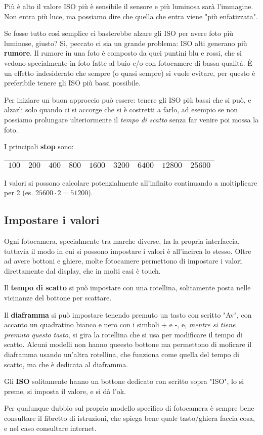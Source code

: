 Più è alto il valore ISO più è sensibile il sensore e più luminosa sarà l'immagine.\\
\nb Non entra più luce, ma possiamo dire che quella che entra viene "più enfatizzata".

Se fosse tutto così semplice ci basterebbe alzare gli ISO per avere foto più luminose, giusto? Sì, peccato ci sia un grande problema: ISO alti generano più \textbf{rumore}.
Il rumore in una foto è composto da quei puntini blu e rossi, che si vedono specialmente in foto fatte al buio e/o con fotocamere di bassa qualità. È un effetto indesiderato che sempre (o quasi sempre) si vuole evitare,
per questo è preferibile tenere gli ISO più bassi possibile.

Per iniziare un buon approccio può essere: tenere gli ISO più bassi che si può, e alzarli solo quando ci si accorge che si è costretti a farlo, ad esempio se non possiamo prolungare ulteriormente il \textit{tempo di scatto} senza far venire poi mossa la foto.

I principali \textbf{stop} sono:
\begin{table}[h]
    \centering
    \begin{tabular}{|l|l|l|l|l|l|l|l|l|}
        \hline
        $100$ & $200$ & $400$ & $800$ & $1600$ & $3200$ & $6400$ & $12800$ & $25600$\\
        \hline
    \end{tabular}
\end{table}

I valori si possono calcolare potenzialmente all'infinito continuando a moltiplicare per 2 (es. $25600 \cdot 2 = 51200$).



\subsection{Impostare i valori} \label{subsec:setvalori}
Ogni fotocamera, specialmente tra marche diverse, ha la propria interfaccia, tuttavia il modo in cui si possono impostare i valori è all'incirca lo stesso.
Oltre ad avere bottoni e ghiere, molte fotocamere permettono di impostare i valori direttamente dal display, che in molti casi è touch.

Il \textbf{tempo di scatto} si può impostare con una rotellina, solitamente posta nelle vicinanze del bottone per scattare.

Il \textbf{diaframma} si può impostare tenendo premuto un tasto con scritto "Av", con accanto un quadratino bianco e nero con i simboli + e -, e, \textit{mentre si tiene premuto questo tasto}, si gira la rotellina che si usa per modificare il tempo di scatto.
Alcuni modelli non hanno queesto bottone ma permettono di moficare il diaframma usando un'altra rotellina, che funziona come quella del tempo di scatto, ma che è dedicata al diaframma.

Gli \textbf{ISO} solitamente hanno un bottone dedicato con scritto sopra "ISO", lo si preme, si imposta il valore, e si dà l'ok.

Per qualunque dubbio sul proprio modello specifico di fotocamera è sempre bene consultare il libretto di istruzioni, che spiega bene quale tasto/ghiera faccia cosa, e nel caso consultare internet.